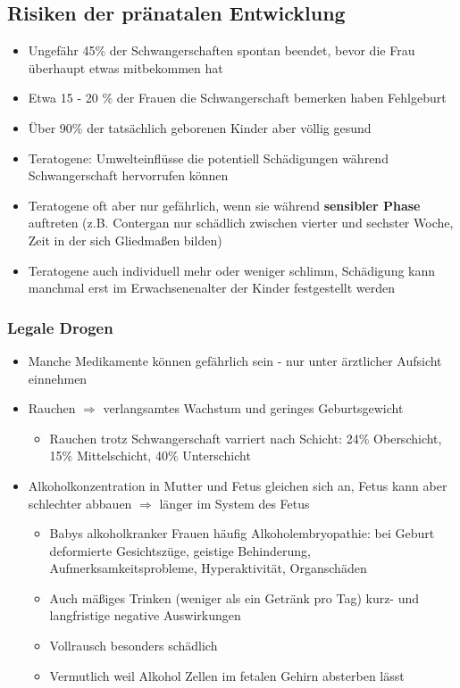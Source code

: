 \subsection{Risiken der pränatalen Entwicklung}
\begin{itemize}
	\item
		Ungefähr 45\% der Schwangerschaften spontan beendet, bevor die Frau überhaupt etwas mitbekommen hat
	\item
		Etwa 15 - 20 \% der Frauen die Schwangerschaft bemerken haben Fehlgeburt
	\item
		Über 90\% der tatsächlich geborenen Kinder aber völlig gesund
	\item
		Teratogene: Umwelteinflüsse die potentiell Schädigungen während Schwangerschaft hervorrufen können
	\item
		Teratogene oft aber nur gefährlich, wenn sie während \textbf{sensibler Phase} auftreten (z.B. Contergan nur schädlich zwischen vierter und sechster Woche, Zeit in der sich Gliedmaßen bilden)
	\item
		Teratogene auch individuell mehr oder weniger schlimm, Schädigung kann manchmal erst im Erwachsenenalter der Kinder festgestellt werden

\end{itemize}

\subsubsection{Legale Drogen}
\begin{itemize}
	\item
		Manche Medikamente können gefährlich sein - nur unter ärztlicher Aufsicht einnehmen
	\item
		Rauchen $\Rightarrow$ verlangsamtes Wachstum und geringes Geburtsgewicht
		\begin{itemize}
			\item
				Rauchen trotz Schwangerschaft varriert nach Schicht: 24\% Oberschicht, 15\% Mittelschicht, 40\% Unterschicht
		\end{itemize}
	\item
		Alkoholkonzentration in Mutter und Fetus gleichen sich an, Fetus kann aber schlechter abbauen $\Rightarrow$ länger im System des Fetus
		\begin{itemize}
			\item
				Babys alkoholkranker Frauen häufig Alkoholembryopathie: bei Geburt deformierte Gesichtszüge, geistige Behinderung, Aufmerksamkeitsprobleme, Hyperaktivität, Organschäden
			\item
				Auch mäßiges Trinken (weniger als ein Getränk pro Tag) kurz- und langfristige negative Auswirkungen
			\item
				Vollrausch besonders schädlich
			\item
				Vermutlich weil Alkohol Zellen im fetalen Gehirn absterben lässt
		\end{itemize}
\end{itemize}

